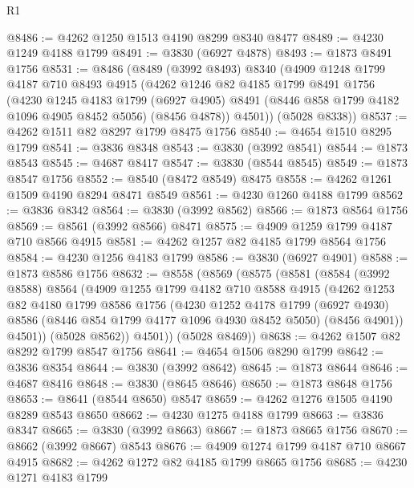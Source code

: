 \begin{lexlean}{R1}
\begin{coremodule}
@8486 := @4262 @1250 @1513 @4190 @8299 @8340 @8477
@8489 := @4230 @1249 @4188 @1799
@8491 := @3830 (@6927 @4878)
@8493 := @1873 @8491 @1756
@8531 := @8486
    (@8489
      (@3992 @8493)
      @8340
      (@4909
        @1248
        @1799
        @4187
        @710
        @8493
        @4915
        (@4262
          @1246
          @82
          @4185
          @1799
          @8491
          @1756
          (@4230
            @1245
            @4183
            @1799
            (@6927 @4905)
            @8491
            (@8446 @858 @1799 @4182 @1096 @4905 @8452 @5056)
            (@8456 @4878))
          @4501))
      (@5028 @8338))
@8537 := @4262 @1511 @82 @8297 @1799 @8475 @1756
@8540 := @4654 @1510 @8295 @1799
@8541 := @3836 @8348
@8543 := @3830 (@3992 @8541)
@8544 := @1873 @8543
@8545 := @4687 @8417
@8547 := @3830 (@8544 @8545)
@8549 := @1873 @8547 @1756
@8552 := @8540 (@8472 @8549) @8475
@8558 := @4262 @1261 @1509 @4190 @8294 @8471 @8549
@8561 := @4230 @1260 @4188 @1799
@8562 := @3836 @8342
@8564 := @3830 (@3992 @8562)
@8566 := @1873 @8564 @1756
@8569 := @8561 (@3992 @8566) @8471
@8575 := @4909 @1259 @1799 @4187 @710 @8566 @4915
@8581 := @4262 @1257 @82 @4185 @1799 @8564 @1756
@8584 := @4230 @1256 @4183 @1799
@8586 := @3830 (@6927 @4901)
@8588 := @1873 @8586 @1756
@8632 := @8558
    (@8569
      (@8575
        (@8581
          (@8584
            (@3992 @8588)
            @8564
            (@4909
              @1255
              @1799
              @4182
              @710
              @8588
              @4915
              (@4262
                @1253
                @82
                @4180
                @1799
                @8586
                @1756
                (@4230
                  @1252
                  @4178
                  @1799
                  (@6927 @4930)
                  @8586
                  (@8446 @854 @1799 @4177 @1096 @4930 @8452 @5050)
                  (@8456 @4901))
                @4501))
            (@5028 @8562))
          @4501))
      (@5028 @8469))
@8638 := @4262 @1507 @82 @8292 @1799 @8547 @1756
@8641 := @4654 @1506 @8290 @1799
@8642 := @3836 @8354
@8644 := @3830 (@3992 @8642)
@8645 := @1873 @8644
@8646 := @4687 @8416
@8648 := @3830 (@8645 @8646)
@8650 := @1873 @8648 @1756
@8653 := @8641 (@8544 @8650) @8547
@8659 := @4262 @1276 @1505 @4190 @8289 @8543 @8650
@8662 := @4230 @1275 @4188 @1799
@8663 := @3836 @8347
@8665 := @3830 (@3992 @8663)
@8667 := @1873 @8665 @1756
@8670 := @8662 (@3992 @8667) @8543
@8676 := @4909 @1274 @1799 @4187 @710 @8667 @4915
@8682 := @4262 @1272 @82 @4185 @1799 @8665 @1756
@8685 := @4230 @1271 @4183 @1799

\end{coremodule}
\end{lexlean}
